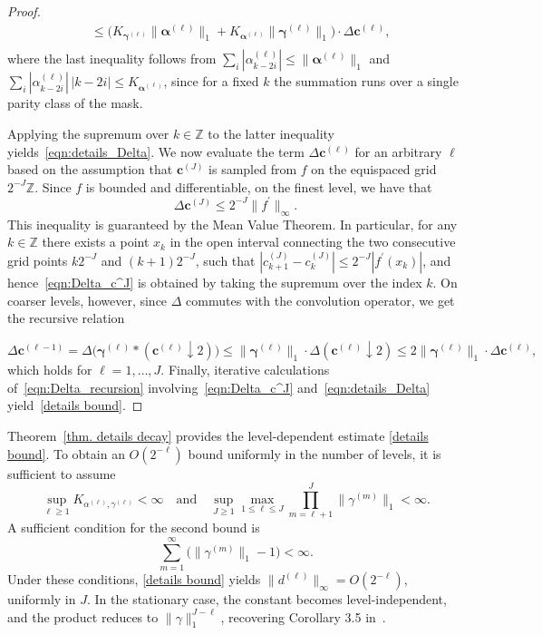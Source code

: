 \documentclass[11pt,a4paper]{article}
\theoremstyle{definition}
\begin{document}
\begin{proof}
\begin{equation*}
\begin{split}
        & \leq \Big(K_{\boldsymbol{\gamma}^{(\ell)}}\|\boldsymbol{\alpha}^{(\ell)}\|_1+K_{\boldsymbol{\alpha}^{(\ell)}} \|\boldsymbol{\gamma}^{(\ell)}\|_1\Big) \cdot \Delta\boldsymbol{c}^{(\ell)},\\
    \end{split}
    \end{equation*}
    where the last inequality follows from $\sum_i|\alpha^{(\ell)}_{k-2i}|\leq\|\boldsymbol{\alpha}^{(\ell)}\|_1$ and $\sum_i|\alpha^{(\ell)}_{k-2i}|\,|k-2i|\leq K_{\boldsymbol{\alpha}^{(\ell)}}$, since for a fixed $k$ the summation runs over a single parity class of the mask.

    Applying the supremum over $k\in\mathbb{Z}$ to the latter inequality yields~\eqref{eqn:details_Delta}. We now evaluate the term $\Delta\boldsymbol{c}^{(\ell)}$ for an arbitrary $\ell$ based on the assumption that $\boldsymbol{c}^{(J)}$ is sampled from $f$ on the equispaced grid $2^{-J}\mathbb{Z}$. Since $f$ is bounded and differentiable, on the finest level, we have that
    \begin{equation}\label{eqn:Delta_c^J}
        \Delta\boldsymbol{c}^{(J)}\leq 2^{-J}\|f^\prime\|_{\infty}.
    \end{equation}
    This inequality is guaranteed by the Mean Value Theorem. In particular, for any $k\in\mathbb{Z}$ there exists a point $x_k$ in the open interval connecting the two consecutive grid points $k2^{-J}$ and $(k+1)2^{-J}$, such that $|c^{(J)}_{k+1}-c^{(J)}_{k}|\leq 2^{-J}|f^\prime (x_k)|$, and hence~\eqref{eqn:Delta_c^J} is obtained by taking the supremum over the index $k$. On coarser levels, however, since $\Delta$ commutes with the convolution operator, we get the recursive relation

    \begin{equation}\label{eqn:Delta_recursion}
        \Delta\boldsymbol{c}^{(\ell-1)} = \Delta\big(\boldsymbol{\gamma}^{(\ell)}*(\boldsymbol{c}^{(\ell)}\downarrow 2)\big)\leq \|\boldsymbol{\gamma}^{(\ell)}\|_1\cdot\Delta(\boldsymbol{c}^{(\ell)}\downarrow 2)\leq 2\|\boldsymbol{\gamma}^{(\ell)}\|_1\cdot\Delta\boldsymbol{c}^{(\ell)},
    \end{equation}
    which holds for $\ell=1,\dots,J$. Finally, iterative calculations of~\eqref{eqn:Delta_recursion} involving~\eqref{eqn:Delta_c^J} and~\eqref{eqn:details_Delta} yield~\eqref{details bound}.
\end{proof}

Theorem~\ref{thm. details decay} provides the level-dependent estimate \eqref{details bound}. To obtain an \(O(2^{-\ell})\) bound uniformly in the number of levels, it is sufficient to assume
$$ \sup_{\ell\ge1}K_{\alpha^{(\ell)},\gamma^{(\ell)}}<\infty \quad\text{and}\quad \sup_{J\ge1}\max_{1\le\ell\le J} \prod_{m=\ell+1}^{J}\|\gamma^{(m)}\|_1<\infty. $$
A sufficient condition for the second bound is
$$ \sum_{m=1}^{\infty}\bigl(\|\gamma^{(m)}\|_1-1\bigr)<\infty. $$
Under these conditions, \eqref{details bound} yields \(\|d^{(\ell)}\|_\infty=O(2^{-\ell})\), uniformly in \(J\). In the stationary case, the constant becomes level-independent, and the product reduces to \(\|\gamma\|_1^{J-\ell}\), recovering Corollary 3.5 in~\cite{mattar2023pyramid}.
\end{document}
